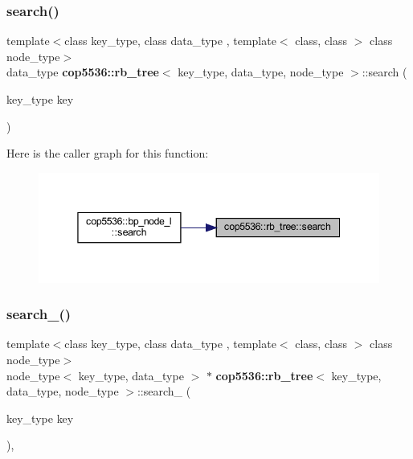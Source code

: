\subsubsection{search()}
{\footnotesize\ttfamily template$<$class key\+\_\+type, class data\+\_\+type , template$<$ class, class $>$ class node\+\_\+type$>$ \\
data\+\_\+type \textbf{ cop5536\+::rb\+\_\+tree}$<$ key\+\_\+type, data\+\_\+type, node\+\_\+type $>$\+::search (\begin{DoxyParamCaption}\item[{key\+\_\+type}]{key }\end{DoxyParamCaption})\hspace{0.3cm}{\ttfamily [inline]}}

Here is the caller graph for this function\+:
\nopagebreak
\begin{figure}[H]
\begin{center}
\leavevmode
\includegraphics[width=345pt]{classcop5536_1_1rb__tree_a5ce2bf3088e27c69862dd9a05c87613f_icgraph}
\end{center}
\end{figure}
\mbox{\label{classcop5536_1_1rb__tree_a82b13475e29dfb76605908cb68d7c405}} 
\subsubsection{search\_()}
{\footnotesize\ttfamily template$<$class key\+\_\+type, class data\+\_\+type , template$<$ class, class $>$ class node\+\_\+type$>$ \\
node\+\_\+type$<$ key\+\_\+type, data\+\_\+type $>$ $\ast$ \textbf{ cop5536\+::rb\+\_\+tree}$<$ key\+\_\+type, data\+\_\+type, node\+\_\+type $>$\+::search\+\_\+ (\begin{DoxyParamCaption}\item[{key\+\_\+type}]{key }\end{DoxyParamCaption})\hspace{0.3cm}{\ttfamily [inline]}, {\ttfamily [virtual]}}

